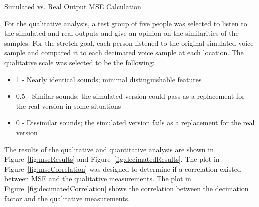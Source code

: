 \documentclass[letterpaper, 11pt, onecolumn, oneside]{article}
\begin{document}
\begin{algorithm}[H]
    \caption{Simulated vs. Real Output MSE Calculation}
    \label{alg:mse}
    \DontPrintSemicolon

       
        
     

    \BlankLine
\end{algorithm}

For the qualitative analysis, a test group of five people was selected to listen to the simulated and real outputs and give an opinion on the similarities of the samples.
For the stretch goal, each person listened to the original simulated voice sample and compared it to each decimated voice sample at each location.
The qualitative scale was selected to be the following:
\begin{itemize}
    \item 1 - Nearly identical sounds; minimal distinguishable features
    \item 0.5 - Similar sounds; the simulated version could pass as a replacement for the real version in some situations
    \item 0 - Dissimilar sounds; the simulated version fails as a replacement for the real version
\end{itemize}

The results of the qualitative and quantitative analysis are shown in Figure~\ref{fig:mseResults} and Figure~\ref{fig:decimatedResults}.
The plot in Figure~\ref{fig:mseCorrelation} was designed to determine if a correlation existed between MSE and the qualitative measurements.
The plot in Figure~\ref{fig:decimatedCorrelation} shows the correlation between the decimation factor and the qualitative measurements.
\end{document}
